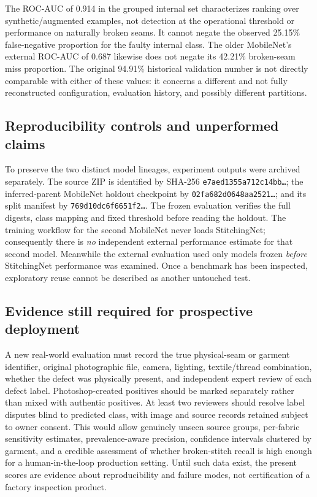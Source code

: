 \documentclass[conference,a4paper]{IEEEtran}
\begin{document}
The ROC-AUC of 0.914 in the grouped internal set characterizes ranking over synthetic/augmented examples, not detection at the operational threshold or performance on naturally broken seams. It cannot negate the observed 25.15\% false-negative proportion for the faulty internal class. The older MobileNet's external ROC-AUC of 0.687 likewise does not negate its 42.21\% broken-seam miss proportion. The original 94.91\% historical validation number is not directly comparable with either of these values: it concerns a different and not fully reconstructed configuration, evaluation history, and possibly different partitions.

\subsection{Reproducibility controls and unperformed claims}
To preserve the two distinct model lineages, experiment outputs were archived separately. The source ZIP is identified by SHA-256 \texttt{e7aed1355a712c14bb\ldots}; the inferred-parent MobileNet holdout checkpoint by \texttt{02fa682d0648aa2521\ldots}; and its split manifest by \texttt{769d10dc6f6651f2\ldots}. The frozen evaluation verifies the full digests, class mapping and fixed threshold before reading the holdout. The training workflow for the second MobileNet never loads StitchingNet; consequently there is \emph{no} independent external performance estimate for that second model. Meanwhile the external evaluation used only models frozen \emph{before} StitchingNet performance was examined. Once a benchmark has been inspected, exploratory reuse cannot be described as another untouched test.

\subsection{Evidence still required for prospective deployment}
A new real-world evaluation must record the true physical-seam or garment identifier, original photographic file, camera, lighting, textile/thread combination, whether the defect was physically present, and independent expert review of each defect label. Photoshop-created positives should be marked separately rather than mixed with authentic positives. At least two reviewers should resolve label disputes blind to predicted class, with image and source records retained subject to owner consent. This would allow genuinely unseen source groups, per-fabric sensitivity estimates, prevalence-aware precision, confidence intervals clustered by garment, and a credible assessment of whether broken-stitch recall is high enough for a human-in-the-loop production setting. Until such data exist, the present scores are evidence about reproducibility and failure modes, not certification of a factory inspection product.
\end{document}
